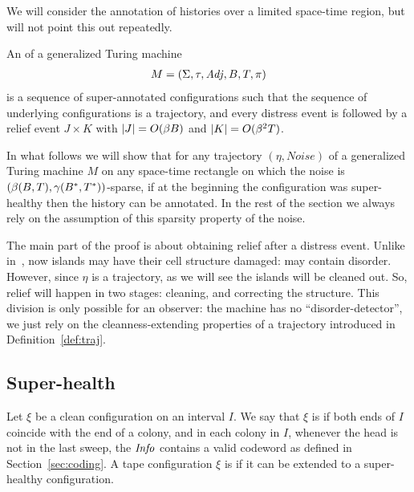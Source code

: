 \documentclass[11pt]{memoir}
\theoremstyle{definition} %
\newcommand{\fld}[1]{\ensuremath{\textit{#1\/}}}
\def\B{B}
\newcommand{\Noise}{\mathit{Noise}}
\newcommand{\passno}{\pi}
\newcommand{\Tu}{T}
\newcommand{\Tus}{T^{*}}
\newcommand{\Adj}{\fld{Adj}}
\newcommand{\Info}{\fld{Info}}
\begin{document}
We will consider the annotation of histories over a limited space-time region, but will
not point this out repeatedly.

\begin{definition}\label{def:annotated-hist}
An  of a generalized Turing machine
    \begin{align*}
        M= (\Sigma, \tau, \Adj,\B, \Tu, \passno)
     \end{align*}
is a sequence of super-annotated configurations such that
the sequence of underlying configurations is a trajectory, and 
every distress event is followed by a relief event \( J\times K \) with 
\( \abs{J}=O(\beta\B) \) and \( \abs{K}= O(\beta^{2}\Tu) \). %
\end{definition}

In what follows we will show that for any trajectory \( (\eta, \Noise) \) of a
generalized Turing machine \( M \) on any space-time rectangle on which the
noise is \( (\beta\pair{\B}{\Tu}, \gamma\pair{\B^{*}}{\Tus}) \)-sparse, if at the
beginning the configuration was super-healthy then the history can be annotated.
In the rest of the section we always rely on the assumption of  this 
sparsity property of the noise.

The main part of the proof is about obtaining relief  after a distress event.
Unlike in~\cite{burstyTuring13}, now islands 
may have their cell structure damaged: may contain disorder.
However, since \( \eta \) is a trajectory, as we will see the islands will be cleaned out.
So, relief will happen in two stages: cleaning, and correcting the structure.
This division is only possible for an observer: the machine has no
``disorder-detector'', we just rely on the cleanness-extending properties of a
trajectory introduced in Definition~\ref{def:traj}.

\subsection{Super-health}

\begin{definition}\label{def:super-health}
  Let \( \xi  \) be a clean configuration on an interval \( I \).
  We say that \( \xi \) is  if both ends of \( I \) coincide with the end of a 
  colony, and in each colony in \( I \), whenever the head is not in the last sweep, the \( \Info \)
  contains a valid codeword as defined in Section~\ref{sec:coding}.
  A tape configuration \( \xi \) is 
  if it can be extended to a super-healthy configuration.
\end{definition}
\end{document}
